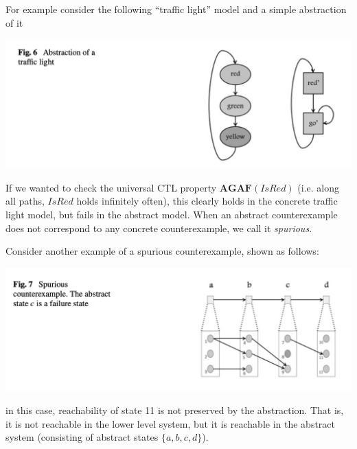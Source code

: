 \documentclass[10pt,a4paper]{article}
\begin{document}
For example consider the following ``traffic light'' model and a simple abstraction of it
\begin{center}
    \includegraphics[scale=0.35]{images/cegar1.png}
\end{center}
If we wanted to check the universal CTL property $\textbf{AGAF}(IsRed)$ (i.e. along all paths, $IsRed$ holds infinitely often), this clearly holds in the concrete traffic light model, but fails in the abstract model. When an abstract counterexample does not correspond to any concrete counterexample, we call it \textit{spurious}.

Consider another example of a spurious counterexample, shown as follows:
\begin{center}
    \includegraphics[scale=0.40]{images/cegar2.png}
\end{center}
in this case, reachability of state 11 is not preserved by the abstraction. That is, it is not reachable in the lower level system, but it is reachable in the abstract system (consisting of abstract states $\{a,b,c,d\}$).
\end{document}
